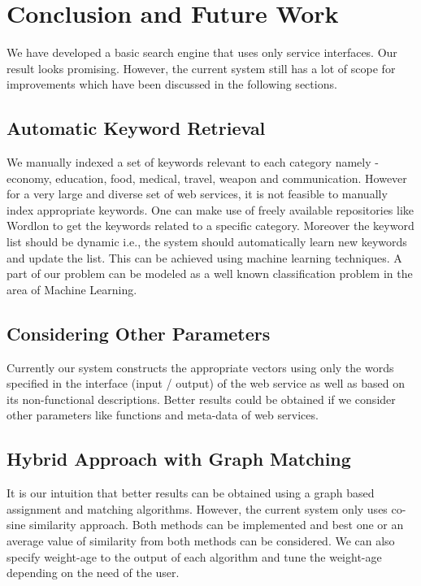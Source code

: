 \documentclass[12pt, oneside]{book}
\begin{document}
\chapter{Conclusion and Future Work}
We have developed a basic search engine that uses only service interfaces. Our result looks promising. However, the current system still has a lot of scope for improvements which have been discussed in the following sections.
\section{Automatic Keyword Retrieval}
We manually indexed a set of keywords relevant to each category namely - economy, education, food, medical, travel, weapon and communication. However for a very large and diverse set of web services, it is not feasible to manually index appropriate keywords. One can make use of freely available repositories like Wordlon to get the keywords related to a specific category. Moreover the keyword list should be dynamic i.e., the system should automatically learn new keywords and update the list. This can be achieved using machine learning techniques. A part of our problem can be modeled as a well known classification problem in the area of Machine Learning.
\section{Considering Other Parameters}
Currently our system constructs the appropriate vectors using only the words specified in the interface (input / output) of the web service as well as based on its non-functional descriptions. Better results could be obtained if we consider other parameters like functions and meta-data of web services.
\section{Hybrid Approach with Graph Matching}
It is our intuition that better results can be obtained using a graph based assignment and matching algorithms. However, the current system only uses co-sine similarity approach. Both methods can be implemented and best one or an average value of similarity from both methods can be considered. We can also specify weight-age to the output of each algorithm and tune the weight-age depending on the need of the user.

\pagebreak


%
%
\end{document}
